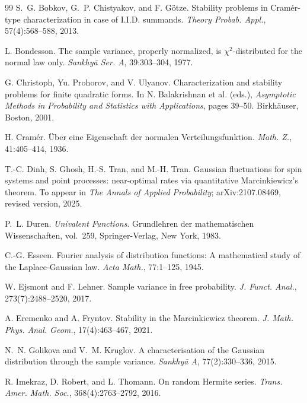 \begin{thebibliography}{99}
S.~G. Bobkov, G.~P. Chistyakov, and F. G\"otze.
\newblock Stability problems in Cram\'er-type characterization in case of I.I.D. summands.
\newblock \emph{Theory Probab. Appl.}, 57(4):568--588, 2013.

L. Bondesson.
\newblock The sample variance, properly normalized, is $\chi^2$-distributed for the normal law only.
\newblock \emph{Sankhy\=a Ser. A}, 39:303--304, 1977.

G. Christoph, Yu. Prohorov, and V. Ulyanov.
\newblock Characterization and stability problems for finite quadratic forms.
\newblock In N. Balakrishnan et al. (eds.), \emph{Asymptotic Methods in Probability and Statistics with Applications}, pages 39--50. Birkh\"auser, Boston, 2001.

H. Cram\'er.
\newblock \"Uber eine Eigenschaft der normalen Verteilungsfunktion.
\newblock \emph{Math. Z.}, 41:405--414, 1936.

T.-C. Dinh, S. Ghosh, H.-S. Tran, and M.-H. Tran.
\newblock Gaussian fluctuations for spin systems and point processes: near-optimal rates via quantitative Marcinkiewicz's theorem.
\newblock To appear in \emph{The Annals of Applied Probability}; arXiv:2107.08469, revised version, 2025.

P.~L. Duren.
\newblock \emph{Univalent Functions}.
\newblock Grundlehren der mathematischen Wissenschaften, vol.~259, Springer-Verlag, New York, 1983.

C.-G. Esseen.
\newblock Fourier analysis of distribution functions: A mathematical study of the Laplace-Gaussian law.
\newblock \emph{Acta Math.}, 77:1--125, 1945.

W. Ejsmont and F. Lehner.
\newblock Sample variance in free probability.
\newblock \emph{J. Funct. Anal.}, 273(7):2488--2520, 2017.

A. Eremenko and A. Fryntov.
\newblock Stability in the Marcinkiewicz theorem.
\newblock \emph{J. Math. Phys. Anal. Geom.}, 17(4):463--467, 2021.

N.~N. Golikova and V.~M. Kruglov.
\newblock A characterisation of the Gaussian distribution through the sample variance.
\newblock \emph{Sankhy\=a A}, 77(2):330--336, 2015.

R. Imekraz, D. Robert, and L. Thomann.
\newblock On random Hermite series.
\newblock \emph{Trans. Amer. Math. Soc.}, 368(4):2763--2792, 2016.


\end{thebibliography}
